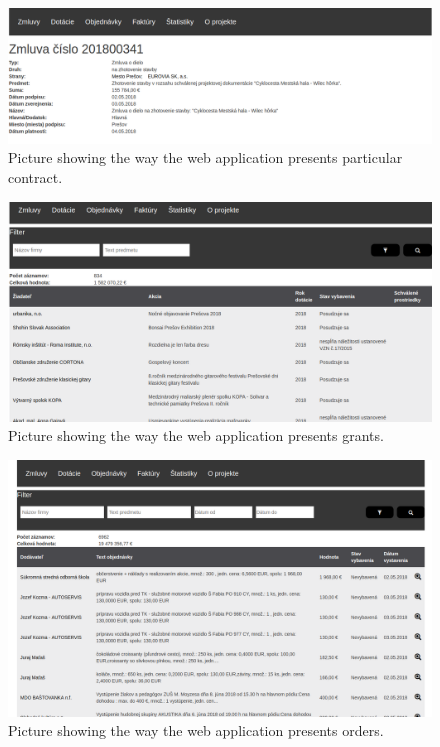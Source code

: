 \documentclass[thesis=B,english]{sprlajur-slovakopendata}[2018/05/12]
\begin{document}
{	\begin{figure}[H]
		\begin{center}
			\includegraphics[scale=0.30]{pictures/contractDetail.png}
			\caption{Picture showing the way the web application presents particular contract.}
			\label{fig:webapp-contract-detail}
		\end{center}
	\end{figure}
	
	\begin{figure}[H]
		\begin{center}
			\includegraphics[scale=0.30]{pictures/grants.png}
			\caption{Picture showing the way the web application presents grants.}
			\label{fig:webapp-grants}
		\end{center}
	\end{figure}
	
	\begin{figure}[H]
		\begin{center}
			\includegraphics[scale=0.30]{pictures/orders.png}
			\caption{Picture showing the way the web application presents orders.}
			\label{fig:webapp-orders}
		\end{center}
	\end{figure}
	
}
\end{document}
